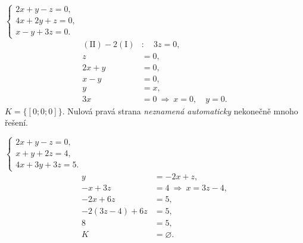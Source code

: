 \documentclass[11pt,a4paper]{article}
\begin{document}
\begin{zadaniReseniBox}[title={Samostatná práce 1}]
$\begin{cases}2x+y-z=0,\\4x+2y+z=0,\\x-y+3z=0.\end{cases}$
\tcblower
\begin{align*}
(\mathrm{II})-2(\mathrm I)&:\quad3z=0,\\
z&=0,\\
2x+y&=0,\\
x-y&=0,\\
y&=x,\\
3x&=0\ \Rightarrow\ x=0,\quad y=0.
\end{align*}
$K=\{[0;0;0]\}$. Nulová pravá strana \emph{neznamená automaticky} nekonečně mnoho řešení.
\end{zadaniReseniBox}
\begin{zadaniReseniBox}[title={Samostatná práce 2}]
$\begin{cases}2x+y-z=0,\\x+y+2z=4,\\4x+3y+3z=5.\end{cases}$
\tcblower
\begin{align*}
y&=-2x+z,\\
-x+3z&=4\ \Rightarrow\ x=3z-4,\\
-2x+6z&=5,\\
-2(3z-4)+6z&=5,\\
8&=5,\\
K&=\varnothing.
\end{align*}
\end{zadaniReseniBox}
\end{document}

